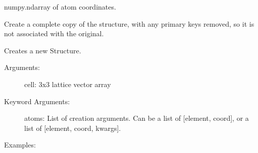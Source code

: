 \documentclass[letterpaper,10pt,english]{sphinxmanual}
\begin{document}
\begin{fulllineitems}

\begin{fulllineitems}
\label{models:qmpy.Structure.coords}
numpy.ndarray of atom coordinates.

\end{fulllineitems}


\begin{fulllineitems}
\label{models:qmpy.Structure.copy}
Create a complete copy of the structure, with any primary keys
removed, so it is not associated with the original.

\end{fulllineitems}


\begin{fulllineitems}
\label{models:qmpy.Structure.create}
Creates a new Structure.
\begin{description}
\item[{Arguments:}] \leavevmode
cell: 3x3 lattice vector array

\item[{Keyword Arguments:}] \leavevmode
atoms: List of  creation arguments. Can be a list of 
{[}element, coord{]}, or a list of {[}element, coord, kwargs{]}.

\end{description}

Examples:


\end{fulllineitems}
\end{fulllineitems}
\end{document}
